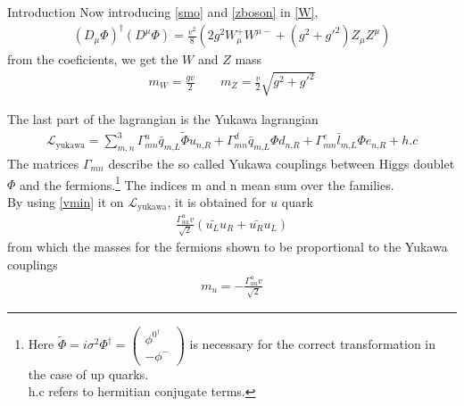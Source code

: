 \begin{chapter}{Introduction}
Now introducing \ref{smo} and \ref{zboson} in \ref{W},
\begin{align}
(D_\mu \Phi)^\dagger (D^\mu \Phi)=\frac{v^2}{8}\left(2g^2 W_\mu^+ W^{\mu-} + (g^2+g'^2)Z_\mu Z^\mu \right) 
\end{align}
from the coeficients, we get the $W$ and $Z$ mass 
\begin{align}
m_W=\frac{gv}{2} \qquad m_Z=\frac{v}{2}\sqrt{g^2+g'^2}
\end{align}


The last part of the lagrangian is the Yukawa lagrangian
\begin{align}
\mathcal{L}_\text{yukawa}=\sum_{m,n}^{3}  \Gamma^u_{mn}\bar{q}_{m\text{,}L} \tilde{\Phi} u_{n\text{,}R}+\Gamma^d_{mn}\bar{q}_{m\text{,}L} \Phi d_{n\text{,}R}+\Gamma^e_{mn}\bar{l}_{m\text{,}L} \Phi e_{n\text{,}R}+h.c
\end{align}
The matrices $\Gamma_{mn}$ describe the so called Yukawa couplings between Higgs doublet $\Phi$ and the fermions.\footnote{Here $
	\tilde{\Phi}=i\sigma^2 \Phi^\dagger =\left(\begin{array}{c}
	\phi^{0^\dagger} \\
	-\phi^-
	\end{array} \right)
	$ is necessary for the correct transformation in the case of up quarks. \\
h.c refers to hermitian conjugate terms. } The indices m and n mean sum over the families. \\
 

By using \ref{vmin} it on $\mathcal{L}_\text{yukawa}$, it is obtained for $u$ quark
\begin{align*}
\frac{\Gamma^u_{uu}v}{\sqrt{2}}(\bar{u_L}u_R+\bar{u_R}u_L)
\end{align*}
from which the masses for the fermions shown to be proportional to the Yukawa couplings
\begin{align*}
m_u=-\frac{\Gamma^u_{uu}v}{\sqrt{2}}
\end{align*}
 

\end{chapter}
